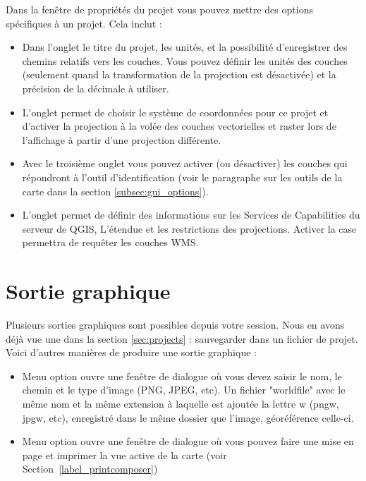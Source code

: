 Dans la fenêtre de propriétés du projet vous pouvez mettre des options spécifiques 
à un projet. Cela inclut :
\begin{itemize}[label=--]
 \item Dans l'onglet  le titre du projet, les unités, et la possibilité 
  d'enregistrer des chemins relatifs vers les couches. Vous pouvez définir les unités 
  des couches (seulement quand la transformation de la projection est désactivée) et 
  la précision de la décimale à utiliser.
 \item L'onglet  permet de choisir le 
  système de coordonnées pour ce projet et d'activer la projection à la volée des 
  couches vectorielles et raster lors de l'affichage à partir d'une projection différente.
 \item Avec le troisième onglet  vous pouvez activer 
  (ou désactiver) les couches qui répondront à l'outil d'identification (voir le 
  paragraphe sur les outils de la carte dans la section \ref{subsec:gui_options}).
  \item L'onglet  permet de définir des informations sur les Services 
  de Capabilities du serveur de QGIS, L'étendue et les restrictions des projections. 
  Activer la case  
  permettra de requêter les couches WMS.
\end{itemize}

\section{Sortie graphique} \label{sec:output}

Plusieurs sorties graphiques sont possibles depuis votre session. Nous en avons déjà vue une dans la section \ref{sec:projects} : sauvegarder dans un fichier de projet.
Voici d'autres manières de produire une sortie graphique :
\begin{itemize}[label=--]
\item Menu option  
ouvre une fenêtre de dialogue où vous devez saisir le nom, le chemin et le type d'image 
(PNG, JPEG, etc). Un fichier "worldfile" avec le même nom et la même extension à laquelle 
est ajoutée la lettre w (pngw, jpgw, etc), enregistré dans le même dossier que l'image, 
géoréférence celle-ci.
\item Menu option  ouvre une 
fenêtre de dialogue où vous pouvez faire une mise en page et imprimer la vue active de 
la carte (voir Section~\ref{label_printcomposer})
\end{itemize}

